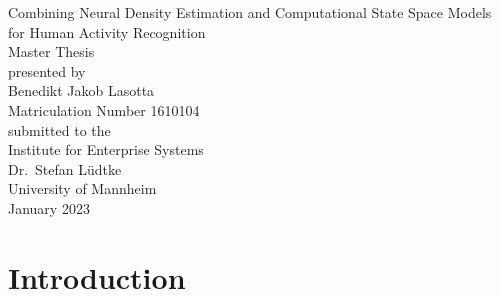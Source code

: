\documentclass[11pt,titlepage,oneside,openany]{book}
\begin{document}
\begin{titlepage}
	\vspace*{2cm}
  \begin{center}
   {\Large Combining Neural Density Estimation and Computational State Space Models for Human Activity Recognition\\}
   \vspace{2cm} 
   {Master Thesis\\}
   \vspace{2cm}
   {presented by\\
    Benedikt Jakob Lasotta \\
    Matriculation Number 1610104\\
   }
   \vspace{1cm} 
   {submitted to the\\
    Institute for Enterprise Systems\\
    Dr.\ Stefan L\"udtke\\
    University of Mannheim\\} \vspace{2cm}
   {January 2023}
  \end{center}
\end{titlepage} 

\tableofcontents
\newpage

\listofalgorithms

\listoffigures

\listoftables


\newpage



\chapter{Introduction}
\label{cha:intro}

\end{document}
